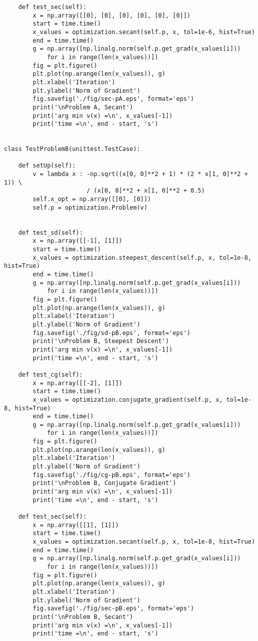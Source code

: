 \begin{lstlisting}
    def test_sec(self):
        x = np.array([[0], [0], [0], [0], [0], [0]])
        start = time.time()
        x_values = optimization.secant(self.p, x, tol=1e-6, hist=True)
        end = time.time()
        g = np.array([np.linalg.norm(self.p.get_grad(x_values[i]))
            for i in range(len(x_values))])
        fig = plt.figure()
        plt.plot(np.arange(len(x_values)), g)
        plt.xlabel('Iteration')
        plt.ylabel('Norm of Gradient')
        fig.savefig('./fig/sec-pA.eps', format='eps')
        print('\nProblem A, Secant')
        print('arg min v(x) =\n', x_values[-1])
        print('time =\n', end - start, 's')


class TestProblemB(unittest.TestCase):

    def setUp(self):
        v = lambda x : -np.sqrt((x[0, 0]**2 + 1) * (2 * x[1, 0]**2 + 1)) \
                       / (x[0, 0]**2 + x[1, 0]**2 + 0.5)
        self.x_opt = np.array([[0], [0]])
        self.p = optimization.Problem(v)


    def test_sd(self):
        x = np.array([[-1], [1]])
        start = time.time()
        x_values = optimization.steepest_descent(self.p, x, tol=1e-8, hist=True)
        end = time.time()
        g = np.array([np.linalg.norm(self.p.get_grad(x_values[i]))
            for i in range(len(x_values))])
        fig = plt.figure()
        plt.plot(np.arange(len(x_values)), g)
        plt.xlabel('Iteration')
        plt.ylabel('Norm of Gradient')
        fig.savefig('./fig/sd-pB.eps', format='eps')
        print('\nProblem B, Steepest Descent')
        print('arg min v(x) =\n', x_values[-1])
        print('time =\n', end - start, 's')

    def test_cg(self):
        x = np.array([[-2], [1]])
        start = time.time()
        x_values = optimization.conjugate_gradient(self.p, x, tol=1e-8, hist=True)
        end = time.time()
        g = np.array([np.linalg.norm(self.p.get_grad(x_values[i]))
            for i in range(len(x_values))])
        fig = plt.figure()
        plt.plot(np.arange(len(x_values)), g)
        plt.xlabel('Iteration')
        plt.ylabel('Norm of Gradient')
        fig.savefig('./fig/cg-pB.eps', format='eps')
        print('\nProblem B, Conjugate Gradient')
        print('arg min v(x) =\n', x_values[-1])
        print('time =\n', end - start, 's')

    def test_sec(self):
        x = np.array([[1], [1]])
        start = time.time()
        x_values = optimization.secant(self.p, x, tol=1e-8, hist=True)
        end = time.time()
        g = np.array([np.linalg.norm(self.p.get_grad(x_values[i]))
            for i in range(len(x_values))])
        fig = plt.figure()
        plt.plot(np.arange(len(x_values)), g)
        plt.xlabel('Iteration')
        plt.ylabel('Norm of Gradient')
        fig.savefig('./fig/sec-pB.eps', format='eps')
        print('\nProblem B, Secant')
        print('arg min v(x) =\n', x_values[-1])
        print('time =\n', end - start, 's')


\end{lstlisting}
